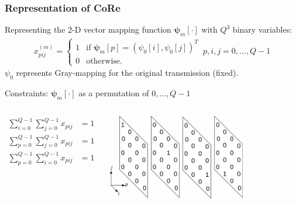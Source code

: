 \documentclass{beamer}
\begin{document}
\begin{frame}
  \frametitle{Representation of CoRe}
  Representing the 2-D vector mapping function $\bm{\psi}_m[\cdot]$
  with $Q^3$ binary variables:
  \begin{align*}
    x_{pij}^{(m)} = \left\{ \begin{array}{cc}1 & \mbox{if } \bm{\psi}_m[p] =
    (\psi_0[i], \psi_0[j])^T\\ 0 & \mbox{otherwise.}\end{array} \right. \,
    p, i, j = 0,\ldots, Q - 1
  \end{align*}
  $\psi_0$ represents Gray-mapping for the original transmission (fixed).
  \begin{block}{Constraints: $\bm{\psi}_m[\cdot]$ as a permutation of $0,\ldots,
  Q - 1$}
    \begin{columns}
      \begin{align*}
        \sum_{i=0}^{Q-1}\sum_{j=0}^{Q-1}x_{pij} & = 1\\
        \sum_{p=0}^{Q-1}\sum_{j=0}^{Q-1}x_{pij} & = 1\\
        \sum_{p=0}^{Q-1}\sum_{i=0}^{Q-1}x_{pij} & = 1
      \end{align*}
      
      \begin{center}
        \includegraphics[width=0.7\textwidth]{figs/constraint_q3ap.pdf}
      \end{center}
      
    \end{columns}
  \end{block}
\end{frame}
\end{document}
